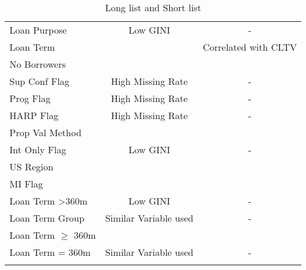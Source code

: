 \begin{longtable}{ l c c }
Loan Purpose                & \cellcolor[HTML]{F7D9E1}Low GINI                             & -                                            \\
Loan Term                   & \cellcolor[HTML]{C0F0C0}                                     & \cellcolor[HTML]{F7D9E1}Correlated with CLTV \\
No Borrowers                & \cellcolor[HTML]{C0F0C0}                                     & \cellcolor[HTML]{C0F0C0}                     \\
Sup Conf Flag               & \cellcolor[HTML]{F7D9E1}High Missing Rate                    & -                                            \\
Prog Flag                   & \cellcolor[HTML]{F7D9E1}High Missing Rate                    & -                                            \\
HARP Flag                   & \cellcolor[HTML]{F7D9E1}High Missing Rate                    & -                                            \\
Prop Val Method             & \cellcolor[HTML]{C0F0C0}                                     & \cellcolor[HTML]{C0F0C0}                     \\
Int Only Flag               & \cellcolor[HTML]{F7D9E1}Low GINI                             & -                                            \\
US Region                   & \cellcolor[HTML]{C0F0C0}                                     & \cellcolor[HTML]{C0F0C0}                     \\
MI Flag                     & \cellcolor[HTML]{C0F0C0}                                     & \cellcolor[HTML]{C0F0C0}                     \\
Loan Term \textgreater 360m & \cellcolor[HTML]{F7D9E1}Low GINI                             & -                                            \\
Loan Term Group             & \cellcolor[HTML]{F7D9E1}Similar Variable used                & -                                            \\
Loan Term $\geq$ 360m       & \cellcolor[HTML]{C0F0C0}                                     & \cellcolor[HTML]{C0F0C0}                     \\
Loan Term = 360m            & \cellcolor[HTML]{F7D9E1}Similar Variable used                & -                                           \\\bottomrule
\caption{Long list and Short list}
\label{tab:re_ll_sl}       
\end{longtable}

